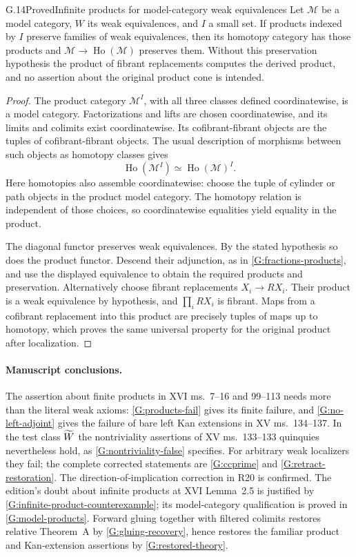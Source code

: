 \begin{claim}{G.14}{Proved}{Infinite products for model-category weak equivalences}
\label{G:model-products}
Let $\mathcal M$ be a model category, $W$ its weak equivalences,
and $I$ a small set.  If products indexed by $I$ preserve
families of weak equivalences, then its homotopy category has
those products and $\mathcal M\to\operatorname{Ho}(\mathcal M)$
preserves them.  Without this preservation hypothesis the
product of fibrant replacements computes the derived product,
and no assertion about the original product cone is intended.
\end{claim}
\begin{proof}
The product category $\mathcal M^I$, with all three classes
defined coordinatewise, is a model category.  Factorizations
and lifts are chosen coordinatewise, and its limits and
colimits exist coordinatewise.  Its cofibrant-fibrant objects
are the tuples of cofibrant-fibrant objects.  The usual
description of morphisms between such objects as homotopy
classes gives
\[
 \operatorname{Ho}(\mathcal M^I)
       \simeq\operatorname{Ho}(\mathcal M)^I.
\]
Here homotopies also assemble coordinatewise: choose the tuple
of cylinder or path objects in the product model category.
The homotopy relation is independent of those choices, so
coordinatewise equalities yield equality in the product.

The diagonal functor preserves weak equivalences.  By the
stated hypothesis so does the product functor.  Descend their
adjunction, as in \ref{G:fractions-products}, and use the
displayed equivalence to obtain the required products and
preservation.  Alternatively choose fibrant replacements
$X_i\to RX_i$.  Their product is a weak equivalence by
hypothesis, and $\prod_i RX_i$ is fibrant.  Maps from a
cofibrant replacement into this product are precisely tuples
of maps up to homotopy, which proves the same universal
property for the original product after localization.
\end{proof}

\paragraph{Manuscript conclusions.}
The assertion about finite products in XVI ms.~7--16 and
99--113 needs more than the literal weak axioms:
\ref{G:products-fail} gives its finite failure, and
\ref{G:no-left-adjoint} gives the failure of bare left Kan
extensions in XV ms.~134--137.  In the test class $\widetilde W$ the
nontriviality assertions of XV ms.~133--133 quinquies nevertheless
hold, as \ref{G:nontriviality-false} specifies.  For arbitrary
weak localizers they fail; the complete corrected statements
are \ref{G:ccprime} and \ref{G:retract-restoration}.
The direction-of-implication correction in R20 is confirmed.
The edition's doubt about infinite products at XVI Lemma~2.5
is justified by \ref{G:infinite-product-counterexample};
its model-category qualification is proved in
\ref{G:model-products}.  Forward gluing together with filtered
colimits restores relative Theorem~A by
\ref{G:gluing-recovery}, hence restores the familiar product
and Kan-extension assertions by \ref{G:restored-theory}.

